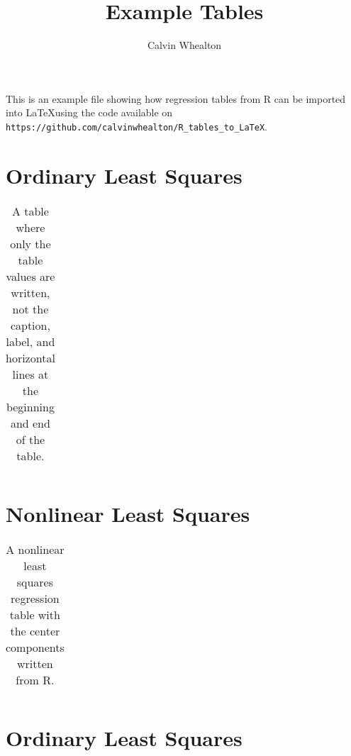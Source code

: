\documentclass{article}
\title{Example Tables}
\author{Calvin Whealton}
\begin{document}
\maketitle

\listoftables

\newpage

This is an example file showing how regression tables from R can be imported into \LaTeX using the code available on \texttt{https://github.com/calvinwhealton/R\_tables\_to\_LaTeX}.


\section{Ordinary Least Squares}

\begin{table}[h!]
\caption{A table where only the table values are written, not the caption, label, and horizontal lines at the beginning and end of the table.}\label{ols1}
\begin{center}
\begin{tabular}{l l l l l}
\hline

\hline
\end{tabular}
\end{center}
\end{table}





\section{Nonlinear Least Squares}

\begin{table}[h!]
\caption{A nonlinear least squares regression table with the center components written from R.}\label{nls1}
\begin{center}
\begin{tabular}{l l l l l}
\hline

\hline
\end{tabular}
\end{center}
\end{table}




\section{Ordinary Least Squares}
\end{document}
